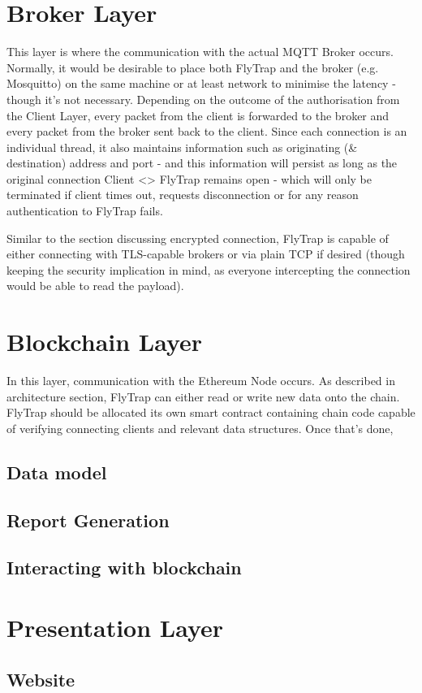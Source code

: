 \section{Broker Layer}

This layer is where the communication with the actual MQTT Broker occurs. Normally, it would be desirable to place both FlyTrap and the broker (e.g. Mosquitto) on the same machine or at least network to minimise the latency - though it's not necessary. Depending on the outcome of the authorisation from the Client Layer, every packet from the client is forwarded to the broker and every packet from the broker sent back to the client. Since each connection is an individual thread, it also maintains information such as originating (\& destination) address and port - and this information will persist as long as the original connection Client <> FlyTrap remains open - which will only be terminated if client times out, requests disconnection or for any reason authentication to FlyTrap fails.

Similar to the section discussing encrypted connection, FlyTrap is capable of either connecting with TLS-capable brokers or via plain TCP if desired (though keeping the security implication in mind, as everyone intercepting the connection would be able to read the payload).

\section{Blockchain Layer}
In this layer, communication with the Ethereum Node occurs. As described in architecture section, FlyTrap can either read or write new data onto the chain. FlyTrap should be allocated its own smart contract containing chain code capable of verifying connecting clients and relevant data structures. Once that's done, 
\subsection{Data model}
\subsection{Report Generation}
\subsection{Interacting with blockchain}
\section{Presentation Layer}
\subsection{Website}